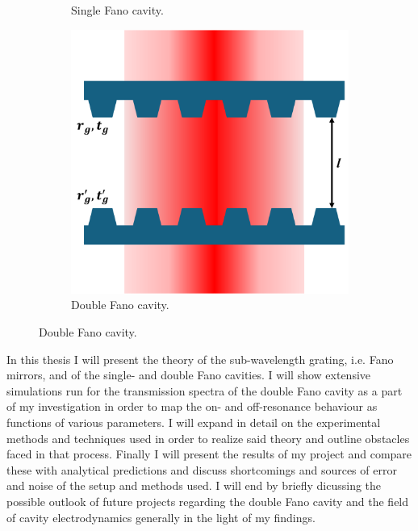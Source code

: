 \begin{figure}[h!]
\begin{subfigure}[b]{0.3\textwidth}
        \caption{Single Fano cavity.}
    \end{subfigure}
    \hfill
    \begin{subfigure}[b]{0.3\textwidth}
        \includegraphics[width=\textwidth]{figures/double_fano_sketch.pdf}
        \caption{Double Fano cavity.}
    \end{subfigure}
\end{figure}


In this thesis I will present the theory of the sub-wavelength grating, i.e. Fano mirrors, and of the single- and double Fano cavities. I will show extensive simulations run for the transmission spectra of the double Fano cavity as a part of my investigation in order to map the on- and off-resonance behaviour as functions of various parameters. I will expand in detail on the experimental methods and techniques used in order to realize said theory and outline obstacles faced in that process. Finally I will present the results of my project and compare these with analytical predictions and discuss shortcomings and sources of error and noise of the setup and methods used. I will end by briefly dicussing the possible outlook of future projects regarding the double Fano cavity and the field of cavity electrodynamics generally in the light of my findings. 